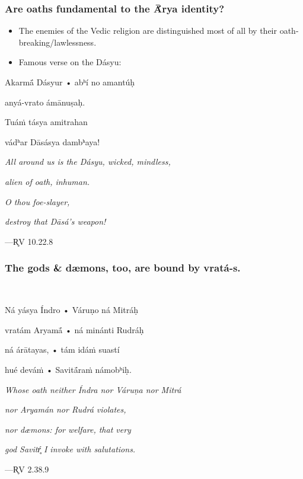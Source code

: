 \documentclass[pdf]{beamer}
\begin{document}
\begin{frame} \frametitle{Are oaths fundamental to the Ā́rya identity?}
\begin{itemize}
	\item The enemies of the Vedic religion are distinguished most of all by their oath-breaking/lawlessness.
	\item Famous verse on the Dásyu:
\end{itemize}
\begin{center}
	Akarmā́ Dásyur • abʰí no amantúḥ

	anyá-vrato ámānuṣaḥ.

	Tuáṁ tásya amitrahan

	vádʰar Dāsásya dambʰaya!

	\vspace{12pt}

	\textit{All around us is the Dásyu, wicked, mindless,}

	\textit{alien of oath, inhuman.}

	\textit{O thou foe-slayer,}

	\textit{destroy that Dāsá's weapon!}

	\vspace{12pt}

 	---R̥V 10.22.8
\end{center}
\end{frame}

\begin{frame} \frametitle{The gods \& dæmons, too, are bound by vratá-s.}\
\begin{center}
	Ná yásya Índro • Váruṇo ná Mitráḥ

	vratám Aryamā́ • ná minánti Rudráḥ

	ná árātayas, • tám idáṁ suastí

	hué deváṁ • Savitā́raṁ námobʰiḥ.

	\vspace{12pt}

	\textit{Whose oath neither Índra nor Váruṇa nor Mitrá}

	\textit{nor Aryamán nor Rudrá violates,}

	\textit{nor dæmons: for welfare, that very}

	\textit{god Savitŕ̥ I invoke with salutations.}

	\vspace{12pt}

 	---R̥V 2.38.9
\end{center}
\end{frame}
\end{document}
